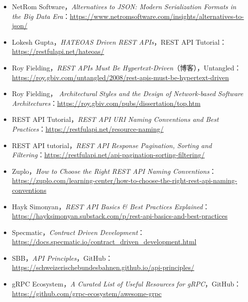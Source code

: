 \begin{itemize}
\item NetRom Software，\emph{Alternatives to JSON: Modern Serialization Formats in the Big Data Era}：\href{https://www.netromsoftware.com/insights/alternatives-to-json/}{https://www.netromsoftware.com/insights/alternatives-to-json/}
\item Lokesh Gupta，\emph{HATEOAS Driven REST APIs}，REST API Tutorial：\href{https://restfulapi.net/hateoas/}{https://restfulapi.net/hateoas/}
\item Roy Fielding，\emph{REST APIs Must Be Hypertext-Driven}（博客），Untangled：\href{https://roy.gbiv.com/untangled/2008/rest-apis-must-be-hypertext-driven}{https://roy.gbiv.com/untangled/2008/rest-apis-must-be-hypertext-driven}
\item Roy Fielding，\emph{ Architectural Styles and the Design of Network-based Software Architectures}：\href{https://roy.gbiv.com/pubs/dissertation/top.htm}{https://roy.gbiv.com/pubs/dissertation/top.htm}
\item REST API Tutorial，\emph{REST API URI Naming Conventions and Best Practices}：\href{https://restfulapi.net/resource-naming/}{https://restfulapi.net/resource-naming/}
\item REST API tutorial，\emph{REST API Response Pagination, Sorting and Filtering}：\href{https://restfulapi.net/api-pagination-sorting-filtering/}{https://restfulapi.net/api-pagination-sorting-filtering/}
\item Zuplo，\emph{How to Choose the Right REST API Naming Conventions}：\href{https://zuplo.com/learning-center/how-to-choose-the-right-rest-api-naming-conventions}{https://zuplo.com/learning-center/how-to-choose-the-right-rest-api-naming-conventions}
\item Hayk Simonyan，\emph{REST API Basics \& Best Practices Explained}：\href{https://hayksimonyan.substack.com/p/rest-api-basics-and-best-practices}{https://hayksimonyan.substack.com/p/rest-api-basics-and-best-practices}
\item Specmatic，\emph{Contract Driven Development}：\href{https://docs.specmatic.io/contract_driven_development.html}{https://docs.specmatic.io/contract\_driven\_development.html}
\item SBB，\emph{API Principles}，GitHub：\href{https://schweizerischebundesbahnen.github.io/api-principles/}{https://schweizerischebundesbahnen.github.io/api-principles/}
\item gRPC Ecosystem，\emph{A Curated List of Useful Resources for gRPC}，GitHub：\href{https://github.com/grpc-ecosystem/awesome-grpc}{https://github.com/grpc-ecosystem/awesome-grpc}

\end{itemize}
